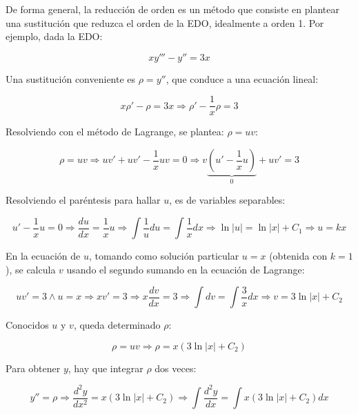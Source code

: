 \documentclass{article}
\begin{document}
De forma general, la reducción de orden es un método que consiste en plantear una sustitución que reduzca el orden de la EDO, idealmente a orden 1. Por ejemplo, dada la EDO:

\begin{equation}
xy''' - y'' = 3x
\end{equation}

Una sustitución conveniente es $\rho = y''$, que conduce a una ecuación lineal:

\begin{equation}
x \rho' - \rho = 3x \Rightarrow \rho' - \frac{1}{x} \rho = 3
\end{equation}

Resolviendo con el método de Lagrange, se plantea: $\rho = u v$:

\begin{equation}
\rho = u v \Rightarrow uv' + uv' - \frac{1}{x} uv = 0 \Rightarrow v \underbrace{ \left(u' - \frac{1}{x} u \right) }_{0} + uv' = 3
\end{equation}

Resolviendo el paréntesis para hallar $u$, es de variables separables:

\begin{equation}
u' - \frac{1}{x} u = 0 \Rightarrow \frac{du}{dx} = \frac{1}{x} u \Rightarrow \int \frac{1}{u} du = \int \frac{1}{x} dx \Rightarrow \ln |u| = \ln |x| + C_1 \Rightarrow u = k x
\end{equation}

En la ecuación de $u$, tomando como solución particular $u = x$ (obtenida con $k=1$), se calcula $v$ usando el segundo sumando en la ecuación de Lagrange:

\begin{equation}
u v' = 3 \wedge u = x \Rightarrow x v' = 3 \Rightarrow x \frac{dv}{dx} = 3 \Rightarrow \int dv = \int \frac{3}{x} dx \Rightarrow v = 3 \ln |x| + C_2
\end{equation}

Conocidos $u$ y $v$, queda determinado $\rho$:

\begin{equation}
\rho = u v \Rightarrow \rho = x (3 \ln |x| + C_2)
\end{equation}

Para obtener $y$, hay que integrar $\rho$ dos veces:

\begin{equation}
y'' = \rho \Rightarrow \frac{d^2y}{dx^2} = x (3 \ln |x| + C_2) \Rightarrow \int \frac{d^2y}{dx} = \int x (3 \ln |x| + C_2) dx
\end{equation}
\end{document}
